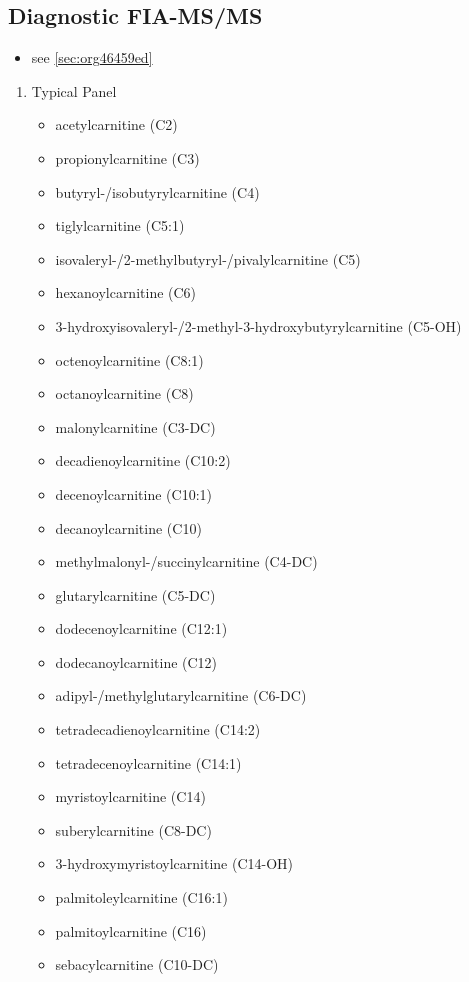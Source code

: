 \documentclass{scrartcl}
\begin{document}
\subsection{Diagnostic FIA-MS/MS}
\label{sec:org45b3346}
\begin{itemize}
\item see \ref{sec:org46459ed}
\end{itemize}

\begin{enumerate}
\item Typical Panel
\label{sec:orgfb463f3}
\begin{itemize}
\item acetylcarnitine (C2)
\item propionylcarnitine (C3)
\item butyryl-/isobutyrylcarnitine (C4)
\item tiglylcarnitine (C5:1)
\item isovaleryl-/2-methylbutyryl-/pivalylcarnitine (C5)
\item hexanoylcarnitine (C6)
\item 3-hydroxyisovaleryl-/2-methyl-3-hydroxybutyrylcarnitine (C5-OH)
\item octenoylcarnitine (C8:1)
\item octanoylcarnitine (C8)
\item malonylcarnitine (C3-DC)
\item decadienoylcarnitine (C10:2)
\item decenoylcarnitine (C10:1)
\item decanoylcarnitine (C10)
\item methylmalonyl-/succinylcarnitine (C4-DC)
\item glutarylcarnitine (C5-DC)
\item dodecenoylcarnitine (C12:1)
\item dodecanoylcarnitine (C12)
\item adipyl-/methylglutarylcarnitine (C6-DC)
\item tetradecadienoylcarnitine (C14:2)
\item tetradecenoylcarnitine (C14:1)
\item myristoylcarnitine (C14)
\item suberylcarnitine (C8-DC)
\item 3-hydroxymyristoylcarnitine (C14-OH)
\item palmitoleylcarnitine (C16:1)
\item palmitoylcarnitine (C16)
\item sebacylcarnitine (C10-DC)

\end{itemize}
\end{enumerate}
\end{document}
